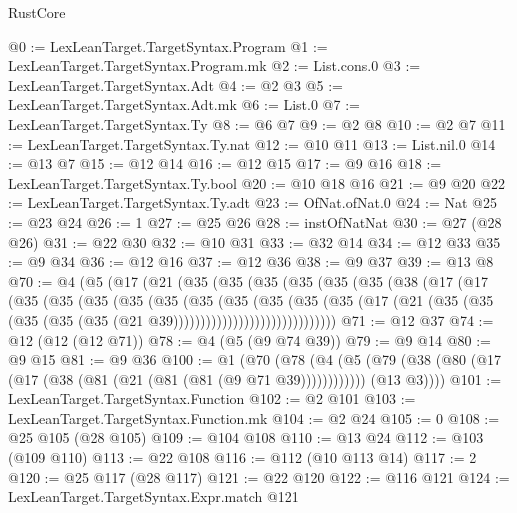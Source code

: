 \begin{lexlean}{RustCore}
\begin{coremodule}
@0 := LexLeanTarget.TargetSyntax.Program
@1 := LexLeanTarget.TargetSyntax.Program.mk
@2 := List.cons.{0}
@3 := LexLeanTarget.TargetSyntax.Adt
@4 := @2 @3
@5 := LexLeanTarget.TargetSyntax.Adt.mk
@6 := List.{0}
@7 := LexLeanTarget.TargetSyntax.Ty
@8 := @6 @7
@9 := @2 @8
@10 := @2 @7
@11 := LexLeanTarget.TargetSyntax.Ty.nat
@12 := @10 @11
@13 := List.nil.{0}
@14 := @13 @7
@15 := @12 @14
@16 := @12 @15
@17 := @9 @16
@18 := LexLeanTarget.TargetSyntax.Ty.bool
@20 := @10 @18 @16
@21 := @9 @20
@22 := LexLeanTarget.TargetSyntax.Ty.adt
@23 := OfNat.ofNat.{0}
@24 := Nat
@25 := @23 @24
@26 := 1
@27 := @25 @26
@28 := instOfNatNat
@30 := @27 (@28 @26)
@31 := @22 @30
@32 := @10 @31
@33 := @32 @14
@34 := @12 @33
@35 := @9 @34
@36 := @12 @16
@37 := @12 @36
@38 := @9 @37
@39 := @13 @8
@70 := @4
    (@5
      (@17
        (@21
          (@35
            (@35
              (@35
                (@35
                  (@35
                    (@35
                      (@38
                        (@17
                          (@17
                            (@35
                              (@35
                                (@35
                                  (@35
                                    (@35
                                      (@35
                                        (@35
                                          (@35
                                            (@35
                                              (@35
                                                (@17
                                                  (@21
                                                    (@35
                                                      (@35
                                                        (@35
                                                          (@35
                                                            (@35
                                                              (@21 @39))))))))))))))))))))))))))))))
@71 := @12 @37
@74 := @12 (@12 (@12 @71))
@78 := @4 (@5 (@9 @74 @39))
@79 := @9 @14
@80 := @9 @15
@81 := @9 @36
@100 := @1
    (@70
      (@78
        (@4
          (@5 (@79 (@38 (@80 (@17 (@17 (@38 (@81 (@21 (@81 (@81 (@9 @71 @39))))))))))))
          (@13 @3))))
@101 := LexLeanTarget.TargetSyntax.Function
@102 := @2 @101
@103 := LexLeanTarget.TargetSyntax.Function.mk
@104 := @2 @24
@105 := 0
@108 := @25 @105 (@28 @105)
@109 := @104 @108
@110 := @13 @24
@112 := @103 (@109 @110)
@113 := @22 @108
@116 := @112 (@10 @113 @14)
@117 := 2
@120 := @25 @117 (@28 @117)
@121 := @22 @120
@122 := @116 @121
@124 := LexLeanTarget.TargetSyntax.Expr.match @121

\end{coremodule}
\end{lexlean}
